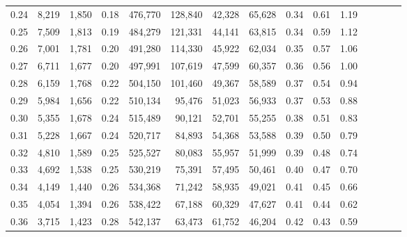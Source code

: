 \begin{tabular}{rrrcrrrrrrrrrrr}
0.24 &   8,219 &  1,850 &                                       0.18 &  476,770 &  128,840 &   42,328 &   65,628 &  0.34 &  0.61 &                         1.19 \\
0.25 &   7,509 &  1,813 &                                       0.19 &  484,279 &  121,331 &   44,141 &   63,815 &  0.34 &  0.59 &                         1.12 \\
0.26 &   7,001 &  1,781 &                                       0.20 &  491,280 &  114,330 &   45,922 &   62,034 &  0.35 &  0.57 &                         1.06 \\
0.27 &   6,711 &  1,677 &                                       0.20 &  497,991 &  107,619 &   47,599 &   60,357 &  0.36 &  0.56 &                         1.00 \\
0.28 &   6,159 &  1,768 &                                       0.22 &  504,150 &  101,460 &   49,367 &   58,589 &  0.37 &  0.54 &                         0.94 \\
0.29 &   5,984 &  1,656 &                                       0.22 &  510,134 &   95,476 &   51,023 &   56,933 &  0.37 &  0.53 &                         0.88 \\
0.30 &   5,355 &  1,678 &                                       0.24 &  515,489 &   90,121 &   52,701 &   55,255 &  0.38 &  0.51 &                         0.83 \\
0.31 &   5,228 &  1,667 &                                       0.24 &  520,717 &   84,893 &   54,368 &   53,588 &  0.39 &  0.50 &                         0.79 \\
0.32 &   4,810 &  1,589 &                                       0.25 &  525,527 &   80,083 &   55,957 &   51,999 &  0.39 &  0.48 &                         0.74 \\
0.33 &   4,692 &  1,538 &                                       0.25 &  530,219 &   75,391 &   57,495 &   50,461 &  0.40 &  0.47 &                         0.70 \\
0.34 &   4,149 &  1,440 &                                       0.26 &  534,368 &   71,242 &   58,935 &   49,021 &  0.41 &  0.45 &                         0.66 \\
0.35 &   4,054 &  1,394 &                                       0.26 &  538,422 &   67,188 &   60,329 &   47,627 &  0.41 &  0.44 &                         0.62 \\
0.36 &   3,715 &  1,423 &                                       0.28 &  542,137 &   63,473 &   61,752 &   46,204 &  0.42 &  0.43 &                         0.59 \\

\end{tabular}
